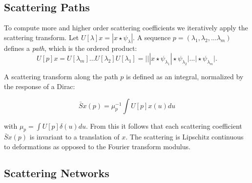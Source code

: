 \subsection{Scattering Paths}
\label{subsec:scattering_path}

To compute more and higher order scattering coefficients we iteratively apply the scattering transform. Let $U[\lambda]x = |x \star \psi_\lambda|$. A sequence $p = (\lambda_1, \lambda_2, ... \lambda_m)$ defines a \textit{path}, which is the ordered product: 
$$U[p]x = U[\lambda_m]...U[\lambda_2]U[\lambda_1] = | ||x \star \psi_{\lambda_1} | \star \psi_{\lambda_2}| ... | \star \psi_{\lambda_m}|. $$

A scattering transform along the path $p$ is defined as an integral, normalized by the response of a Dirac:

$$\bar{S}x(p) = \mu_p^{-1} \int U[p]x(u)du$$

with $\mu_p = \int U[p] \delta(u) du$. From this it follows that each scattering coefficient $\bar{S}x(p)$ is invariant to a translation of $x$. The scattering is Lipschitz continuous to deformations as opposed to the Fourier transform modulus.


\subsection{Scattering Networks}
\label{subsec:scattering_networks}



